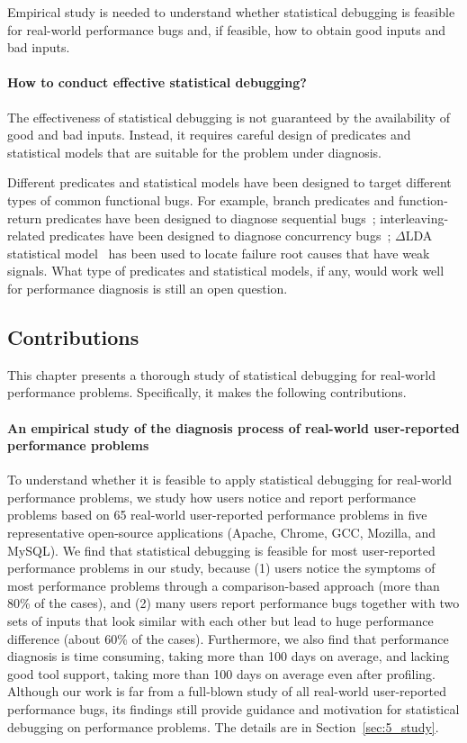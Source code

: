 Empirical study is needed to understand whether statistical debugging is feasible
for real-world performance bugs and, if feasible, how to obtain good inputs and
bad inputs.

\paragraph{How to conduct effective statistical debugging?}
The effectiveness of statistical debugging is not guaranteed by the
availability of good and bad inputs. Instead, it requires careful design
of predicates and statistical models that are suitable for the problem
under diagnosis.

Different predicates and
statistical models have been designed to target different types of common
functional bugs. 
For example, branch predicates and function-return predicates have been
designed to diagnose sequential bugs~\citep{liblit03,liblit05}; 
interleaving-related predicates have been designed to diagnose concurrency bugs~\citep{CCI,joy.asplos13}; 
$\Delta$LDA statistical model~\citep{Delta-LDA} has
been used to locate failure root causes that have weak signals.
What type of predicates and statistical models, if any, would work well
for performance diagnosis is still
an open question.

\subsection{Contributions}
This chapter presents a thorough study of statistical debugging for real-world 
performance 
problems. Specifically, it makes the following contributions.

\paragraph{An empirical study of the diagnosis process of real-world 
user-reported performance problems}  
To understand whether it is feasible to apply statistical debugging for
real-world performance problems, we study how users notice and report
performance problems based
on 65 real-world user-reported performance
problems in five representative open-source applications (Apache, Chrome, 
GCC, Mozilla, and MySQL).
We find that statistical debugging is feasible for most
user-reported performance problems in our study, because
(1) users notice the symptoms of most 
performance problems through a comparison-based approach 
(more than 80\% of the cases), and
(2) many users report performance bugs together with two sets of inputs that
look similar with each other but lead to %
huge performance difference
(about 60\% of the cases).
Furthermore, we also find that performance diagnosis is time consuming,
taking more than 100 days on average,
and lacking good tool support, taking more than 100 days on average even after 
profiling. 
Although our work is far from a full-blown study of all real-world
user-reported performance bugs, its
findings still provide guidance and motivation
for statistical debugging on performance problems. The details are 
in Section~\ref{sec:5_study}.

